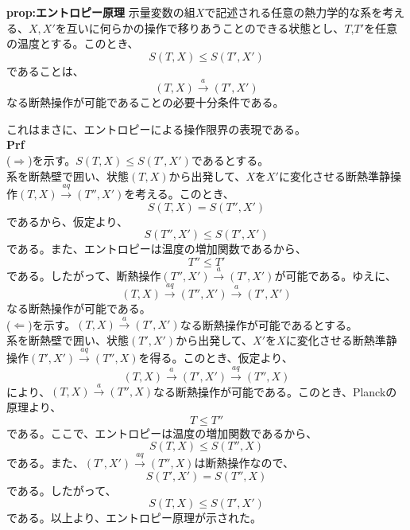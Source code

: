 \documentclass[a4paper,11pt]{jsarticle}
\begin{document}
\begin{itembox}[l]{\textbf{prop:エントロピー原理}}
    示量変数の組$X$で記述される任意の熱力学的な系を考える、$X,X'$を互いに何らかの操作で移りあうことのできる状態とし、$T$,$T'$を任意の温度とする。このとき、
    \begin{equation}
        S(T,X) \leq S(T',X')
    \end{equation}
    であることは、
    \begin{equation}
        (T,X) \xrightarrow{a} (T',X')
    \end{equation}
    なる断熱操作が可能であることの必要十分条件である。
\end{itembox}
これはまさに、エントロピーによる操作限界の表現である。\\
\textbf{Prf}\\
($\Rightarrow$)を示す。$S(T,X) \leq S(T',X')$であるとする。\\
系を断熱壁で囲い、状態$(T,X)$から出発して、$X$を$X'$に変化させる断熱準静操作$(T,X)\xrightarrow{aq}(T'',X')$を考える。このとき、
\begin{equation}
    S(T,X) = S(T'',X')
\end{equation}
であるから、仮定より、
\begin{equation}
    S(T'',X') \leq S(T',X')
\end{equation}
である。また、エントロピーは温度の増加関数であるから、
\begin{equation}
    T'' \leq T'
\end{equation}
である。したがって、断熱操作$(T'',X')\xrightarrow{a}(T',X')$が可能である。ゆえに、
\begin{equation}
    (T,X) \xrightarrow{aq} (T'',X') \xrightarrow{a} (T',X')
\end{equation}
なる断熱操作が可能である。\\
($\Leftarrow$)を示す。$(T,X)\xrightarrow{a}(T',X')$なる断熱操作が可能であるとする。\\
系を断熱壁で囲い、状態$(T',X')$から出発して、$X'$を$X$に変化させる断熱準静操作$(T',X')\xrightarrow{aq}(T'',X)$を得る。このとき、仮定より、
\begin{equation}
    (T,X) \xrightarrow{a} (T',X') \xrightarrow{aq} (T'',X)
\end{equation}
により、$(T,X)\xrightarrow{a}(T'',X)$なる断熱操作が可能である。このとき、Planckの原理より、
\begin{equation}
    T \leq T''
\end{equation}
である。ここで、エントロピーは温度の増加関数であるから、
\begin{equation}
    S(T,X) \leq S(T'',X)
\end{equation}
である。また、$(T',X')\xrightarrow{aq}(T'',X)$は断熱操作なので、
\begin{equation}
    S(T',X') = S(T'',X)
\end{equation}
である。したがって、
\begin{equation}
    S(T,X) \leq S(T',X')
\end{equation}
である。以上より、エントロピー原理が示された。\\
\end{document}
